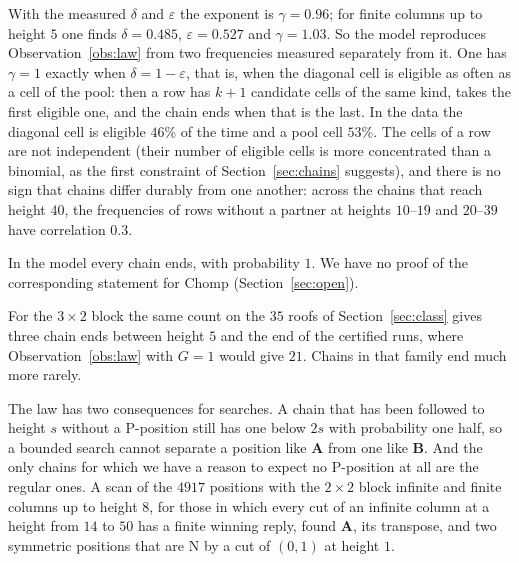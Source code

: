 \documentclass[11pt]{amsart}
\theoremstyle{definition}
\theoremstyle{remark}
\newcommand{\PA}{\mathbf{A}}
\newcommand{\PB}{\mathbf{B}}
\begin{document}
With the measured $\delta$ and $\varepsilon$ the exponent is $\gamma=0.96$; for finite columns
up to height $5$ one finds $\delta=0.485$, $\varepsilon=0.527$ and $\gamma=1.03$. So the model
reproduces Observation~\ref{obs:law} from two frequencies measured separately from it. One has
$\gamma=1$ exactly when $\delta=1-\varepsilon$, that is, when the diagonal cell is eligible as
often as a cell of the pool: then a row has $k+1$ candidate cells of the same kind, takes the
first eligible one, and the chain ends when that is the last. In the data the diagonal cell
is eligible $46\%$ of the time and a pool cell $53\%$. The cells of a row are not independent
(their number of eligible cells is more concentrated than a binomial, as the first constraint
of Section~\ref{sec:chains} suggests), and there is no sign that chains differ durably from one
another: across the chains that reach height $40$, the frequencies of rows without a partner
at heights $10$--$19$ and $20$--$39$ have correlation $0.3$.

In the model every chain ends, with probability $1$. We have no proof of the corresponding
statement for Chomp (Section~\ref{sec:open}).

For the $3\times2$ block the same count on the $35$ roofs of Section~\ref{sec:class} gives
three chain ends between height $5$ and the end of the certified runs, where
Observation~\ref{obs:law} with $G=1$ would give $21$. Chains in that family end much more
rarely.

The law has two consequences for searches. A chain that has been followed to height $s$
without a P-position still has one below $2s$ with probability one half, so a bounded search
cannot separate a position like $\PA$ from one like $\PB$. And the only chains for which we have
a reason to expect no P-position at all are the regular ones. A scan of the $4917$ positions
with the $2\times2$ block infinite and finite columns up to height $8$, for those in which every
cut of an infinite column at a height from $14$ to $50$ has a finite winning reply, found
$\PA$, its transpose, and two symmetric positions that are N by a cut of $(0,1)$ at height $1$.
\end{document}
